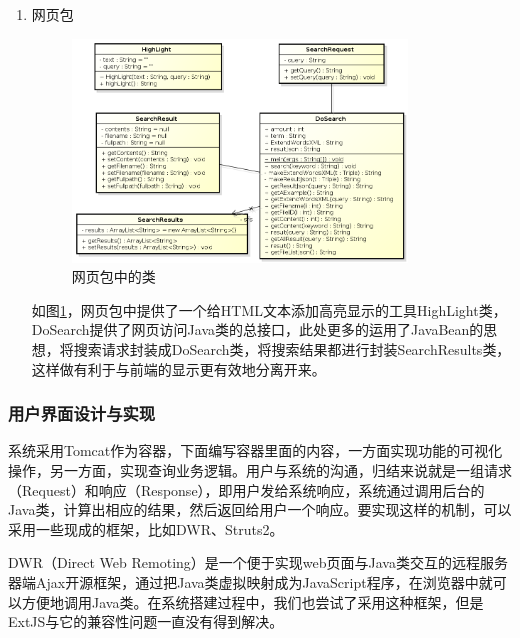 \documentclass[12pt,a4paper]{article}
\newcommand{\wuhao}{\fontsize{10.5pt}{\baselineskip}\selectfont}
\begin{document}
\begin{enumerate}[(1)]
	\item 网页包
	
	\begin{figure}[htbp] 
	\centering\includegraphics[width=3.5in]{fig/webpackage.png} 
	\caption{\wuhao 网页包中的类}\label{fig:web包}
	\end{figure}
	如图\ref{fig:web包}，网页包中提供了一个给{\Times HTML}文本添加高亮显示的工具{\Times HighLight}类，{\Times DoSearch}提供了网页访问{\Times Java}类的总接口，此处更多的运用了{\Times JavaBean}的思想，将搜索请求封装成{\Times DoSearch}类，将搜索结果都进行封装{\Times SearchResults}类，这样做有利于与前端的显示更有效地分离开来。
	\end{enumerate}

		\subsubsection{用户界面设计与实现}
	系统采用{\Times Tomcat}作为容器，下面编写容器里面的内容，一方面实现功能的可视化操作，另一方面，实现查询业务逻辑。用户与系统的沟通，归结来说就是一组请求（{\Times Request}）和响应（{\Times Response}），即用户发给系统响应，系统通过调用后台的{\Times Java}类，计算出相应的结果，然后返回给用户一个响应。要实现这样的机制，可以采用一些现成的框架，比如{\Times DWR}、{\Times Struts2}。
	
	{\Times DWR}（{\Times Direct Web Remoting}）是一个便于实现{\Times web}页面与{\Times Java}类交互的远程服务器端{\Times Ajax}开源框架，通过把{\Times Java}类虚拟映射成为{\Times JavaScript}程序，在浏览器中就可以方便地调用{\Times Java}类。在系统搭建过程中，我们也尝试了采用这种框架，但是{\Times ExtJS}与它的兼容性问题一直没有得到解决。
	
\end{document}
